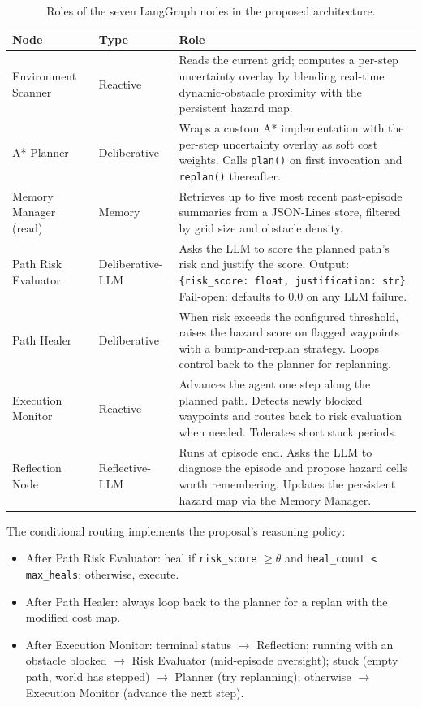 \documentclass[11pt, letterpaper]{article}
\begin{document}
\begin{table}[H]
    \centering
    \small
    \caption{Roles of the seven LangGraph nodes in the proposed architecture.}
    \label{tab:seven-nodes}
    \begin{tabular}{p{} p{} p{}}
        \toprule
        \textbf{Node} & \textbf{Type} & \textbf{Role} \\
        \midrule
        Environment Scanner & Reactive & Reads the current grid; computes a per-step uncertainty overlay by blending real-time dynamic-obstacle proximity with the persistent hazard map. \\
        A* Planner & Deliberative & Wraps a custom A* implementation with the per-step uncertainty overlay as soft cost weights. Calls \texttt{plan()} on first invocation and \texttt{replan()} thereafter. \\
        Memory Manager (read) & Memory & Retrieves up to five most recent past-episode summaries from a JSON-Lines store, filtered by grid size and obstacle density. \\
        Path Risk Evaluator & Deliberative-LLM & Asks the LLM to score the planned path's risk and justify the score. Output: \texttt{\{risk\_score: float, justification: str\}}. Fail-open: defaults to 0.0 on any LLM failure. \\
        Path Healer & Deliberative & When risk exceeds the configured threshold, raises the hazard score on flagged waypoints with a bump-and-replan strategy. Loops control back to the planner for replanning. \\
        Execution Monitor & Reactive & Advances the agent one step along the planned path. Detects newly blocked waypoints and routes back to risk evaluation when needed. Tolerates short stuck periods. \\
        Reflection Node & Reflective-LLM & Runs at episode end. Asks the LLM to diagnose the episode and propose hazard cells worth remembering. Updates the persistent hazard map via the Memory Manager. \\
        \bottomrule
    \end{tabular}
\end{table}

The conditional routing implements the proposal's reasoning policy:

\begin{itemize}
    \item After Path Risk Evaluator: heal if \texttt{risk\_score} $\geq \theta$ and \texttt{heal\_count < max\_heals}; otherwise, execute.
    \item After Path Healer: always loop back to the planner for a replan with the modified cost map.
    \item After Execution Monitor: terminal status $\rightarrow$ Reflection; running with an obstacle blocked $\rightarrow$ Risk Evaluator (mid-episode oversight); stuck (empty path, world has stepped) $\rightarrow$ Planner (try replanning); otherwise $\rightarrow$ Execution Monitor (advance the next step).
\end{itemize}
\end{document}
